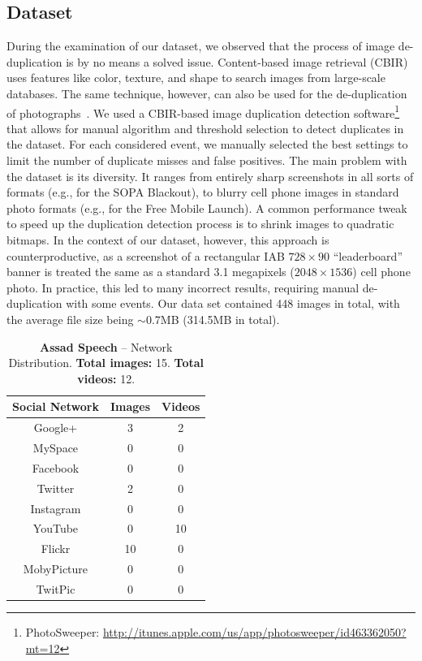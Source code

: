 \documentclass{acm_proc_article-sp}
\newcommand{\inlinelistingsize}{\fontsize{8pt}{11pt}}
\let\oldurl\url
\renewcommand{\url}[1]{\inlinelistingsize\oldurl{#1}}
\begin{document}
\subsection{Dataset}
\label{subsec:dataset}
During the examination of our dataset, we observed that the process of image de-duplication is by no means a solved issue.
Content-based image retrieval (CBIR) uses features like color, texture, and shape to search images from large-scale databases.
The same technique, however, can also be used for the de-duplication of photographs~\cite{Pattabhi2011}.
We used a CBIR-based image duplication detection software\footnote{PhotoSweeper: \url{http://itunes.apple.com/us/app/photosweeper/id463362050?mt=12}} that allows for manual algorithm and threshold selection to detect duplicates in the dataset.
For each considered event, we manually selected the best settings to limit the number of duplicate misses and false positives.
The main problem with the dataset is its diversity.
It ranges from entirely sharp screenshots in all sorts of formats (e.g., for the SOPA Blackout), to blurry cell phone images in standard photo formats (e.g., for the Free Mobile Launch).
A common performance tweak to speed up the duplication detection process is to shrink images to quadratic bitmaps.
In the context of our dataset, however, this approach is counterproductive, as a screenshot of a rectangular IAB $728 \times 90$ ``leaderboard'' banner is treated the same as a standard 3.1 megapixels ($2048 \times 1536$) cell phone photo.
In practice, this led to many incorrect results, requiring manual de-duplication with some events.
Our data set contained 448 images in total, with the average file size being $\sim$0.7MB (314.5MB in total).

\begin{table}[htbp]
  \begin{tabular}{ | c | c | c | }
    \hline
    \textbf{Social Network} & \textbf{Images} & \textbf{Videos}\\
    \hline
    Google+ & 3 & 2\\
    MySpace & 0 & 0\\
    Facebook & 0 & 0\\
    Twitter & 2 & 0\\
    Instagram & 0 & 0\\
    YouTube & 0 & 10\\
    Flickr & 10 & 0\\
    MobyPicture & 0 & 0\\
    TwitPic & 0 & 0\\
    \hline
  \end{tabular}
  \label{tab:assad}
  \caption{\textbf{Assad Speech} -- Network Distribution. \textbf{Total images:} 15. \textbf{Total videos:} 12.}
\end{table}
\end{document}
